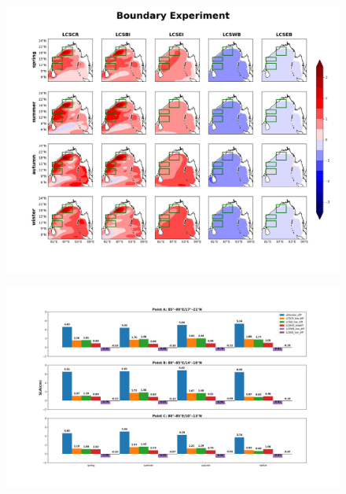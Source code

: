 \documentclass[review]{elsarticle}
\begin{document}
\begin{figure}[!t]
\centering
\includegraphics[scale=0.35]{images/boundary_expt.jpeg}
\caption{}
\label{fig}
\end{figure}

\begin{figure}[!t]
\centering
\includegraphics[scale=0.35]{images/point_comparison.jpeg}
\caption{}
\label{fig}
\end{figure}








\end{document}

